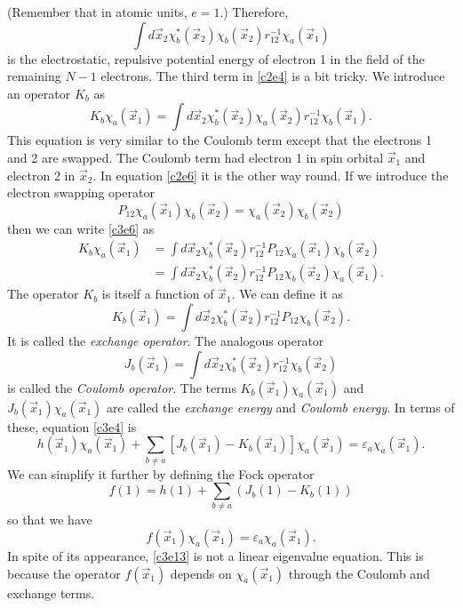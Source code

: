 (Remember that in atomic units, $e = 1$.) Therefore,
\[
\int d\vec{x}_2\chi_b^\ast(\vec{x}_2)\chi_b(\vec{x}_2)r_{12}^{-1}
\chi_a(\vec{x}_1)
\]
is the electrostatic, repulsive potential energy of electron 1 in the field of
the remaining $N-1$ electrons. The third term in \eqref{c2e4} is a bit tricky.
We introduce an operator $K_b$ as
\begin{equation}\label{c3e6}
K_b\chi_a(\vec{x}_1) = \int d\vec{x}_2 \chi_b^\ast(\vec{x}_2)\chi_a(\vec{x}_2)
r_{12}^{-1}\chi_b(\vec{x}_1).
\end{equation}
This equation is very similar to the Coulomb term except that the electrons
1 and 2 are swapped. The Coulomb term had electron 1 in spin orbital $\vec{x}_1$
and electron 2 in $\vec{x}_2$. In equation \eqref{c2e6} it is the other way 
round. If we introduce the electron swapping operator
\begin{equation}\label{c3e7}
P_{12}\chi_a(\vec{x}_1)\chi_b(\vec{x}_2) = \chi_a(\vec{x}_2)\chi_b(\vec{x}_2)
\end{equation}
then we can write \eqref{c3e6} as
\begin{equation}\label{c3e8}
\begin{aligned}
K_b\chi_a(\vec{x}_1) &= \int d\vec{x}_2 \chi_b^\ast(\vec{x}_2)
r_{12}^{-1}P_{12}\chi_a(\vec{x}_1)\chi_b(\vec{x}_2) \\
 &= \int d\vec{x}_2\chi_b^\ast(\vec{x}_2) r_{12}^{-1}P_{12}\chi_b(\vec{x}_2)
 \chi_a(\vec{x}_1).
\end{aligned}
\end{equation}
The operator $K_b$ is itself a function of $\vec{x}_1$. We can define it as
\begin{equation}\label{c3e9}
K_b(\vec{x}_1) = 
\int d\vec{x}_2\chi_b^\ast(\vec{x}_2)r_{12}^{-1}P_{12}\chi_b(\vec{x}_2).
\end{equation}
It is called the \emph{exchange operator}. The analogous operator
\begin{equation}\label{c3e10}
J_b(\vec{x}_1) = 
\int d\vec{x}_2\chi_b^\ast(\vec{x}_2)r_{12}^{-1}\chi_b(\vec{x}_2)
\end{equation}
is called the \emph{Coulomb operator}. The terms $K_b(\vec{x}_1)\chi_a(\vec{x}_1)$
and $J_b(\vec{x}_1)\chi_a(\vec{x}_1)$ are called the \emph{exchange energy} and
\emph{Coulomb energy}. In terms of these, equation \eqref{c3e4} is
\begin{equation}\label{c3e11}
h(\vec{x}_1)\chi_a(\vec{x}_1) + \sum_{b \ne a}\left[J_b(\vec{x}_1) - 
K_b(\vec{x}_1)\right]\chi_a(\vec{x}_1) = \varepsilon_a\chi_a(\vec{x}_1).
\end{equation}
We can simplify it further by defining the Fock operator
\begin{equation}\label{c3e12}
f(1) = h(1) + \sum_{b \ne a}(J_b(1) - K_b(1))
\end{equation}
so that we have
\begin{equation}\label{c3e13}
f(\vec{x}_1)\chi_a(\vec{x}_1) = \varepsilon_a\chi_a(\vec{x}_1).
\end{equation}
In spite of its appearance, \eqref{c3e13} is not a linear eigenvalue equation.
This is because the operator $f(\vec{x}_1)$ depends on $\chi_a(\vec{x}_1)$
through the Coulomb and exchange terms.

